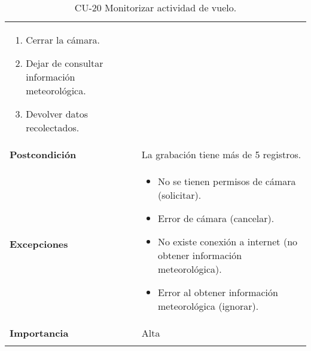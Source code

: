 \begin{longtable}[H]{@{}ll@{}}
\begin{minipage}[t]{0.75\columnwidth}
\begin{enumerate}
  \begin{enumerate}
  \def\labelenumii{\alph{enumii}.}
  \tightlist
  \item
    Cerrar la cámara.
  \item
    Dejar de consultar información meteorológica.
  \item
    Devolver datos recolectados.
  \end{enumerate}
\end{enumerate}\strut
\end{minipage}\tabularnewline
\begin{minipage}[t]{0.269\columnwidth}\raggedright\strut
\textbf{Postcondición}\strut
\end{minipage} & \begin{minipage}[t]{0.75\columnwidth}\raggedright\strut
La grabación tiene más de 5 registros.\strut
\end{minipage}\tabularnewline
\begin{minipage}[t]{0.269\columnwidth}\raggedright\strut
\textbf{Excepciones}\strut
\end{minipage} & \begin{minipage}[t]{0.75\columnwidth}\raggedright\strut
\begin{itemize}
\tightlist
\item
  No se tienen permisos de cámara (solicitar).
\item
  Error de cámara (cancelar).
\item
  No existe conexión a internet (no obtener información meteorológica).
\item
  Error al obtener información meteorológica (ignorar).
\end{itemize}\strut
\end{minipage}\tabularnewline
\begin{minipage}[t]{0.269\columnwidth}\raggedright\strut
\textbf{Importancia}\strut
\end{minipage} & \begin{minipage}[t]{0.75\columnwidth}\raggedright\strut
Alta\strut
\end{minipage}\tabularnewline
\bottomrule
\caption{CU-20 Monitorizar actividad de vuelo.}
\end{longtable}

